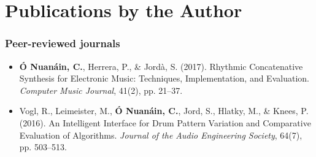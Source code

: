 \newcommand\contrib[1]{\\~{\footnotesize (#1)}}
% 
\newcommand\resource[2]{
	\noindent #1 \par
	\vspace{0.2em}
	{\centering	\url{#2} \par}
	\vspace{0.5em}
	\hrule \par 
	\vspace{0.8em} \par}
%
%
\chapter[Publications by the Author][Publications by the Author]{Publications by the Author}
\label{app:mypapers}%


\subsection*{Peer-reviewed journals}
\begin{itemize}[leftmargin=*]
	\item \textbf{Ó Nuanáin, C.}, Herrera, P., \& Jordà, S. (2017). Rhythmic Concatenative Synthesis for Electronic Music: Techniques, Implementation, and Evaluation. \textit{Computer Music Journal}, 41(2), pp. 21–37.
	\item Vogl, R., Leimeister, M., \textbf{Ó Nuanáin, C.}, Jord, S., Hlatky, M., \& Knees, P. (2016). An Intelligent Interface for Drum Pattern Variation and Comparative Evaluation of Algorithms. \textit{Journal of the Audio Engineering Society}, 64(7), pp. 503–513.
	
\end{itemize}
%
